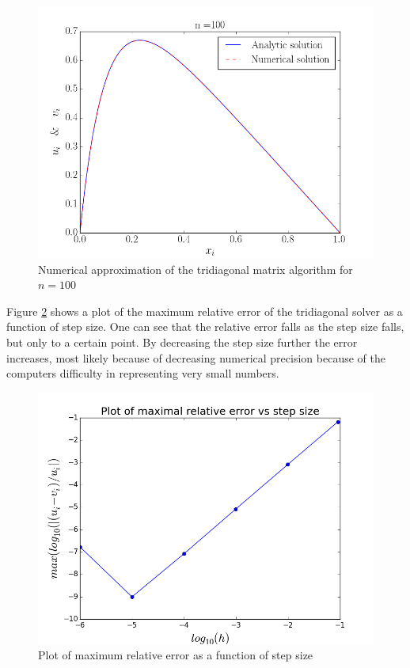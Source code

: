 \documentclass[10pt, a4paper]{amsart}
\begin{document}
\begin{figure}[h]
  \centering
  \includegraphics[width=0.9\linewidth]{figures/100.png}
  \caption{Numerical approximation of the tridiagonal matrix algorithm for $n=100$}
  \label{fig:n100}
\end{figure}

Figure \ref{fig:relerror} shows a plot of the maximum relative error of the
tridiagonal solver as a function of step size. One can see that the
relative error falls as the step size falls, but only to a certain
point. By decreasing the step size further the error increases, most
likely because of decreasing numerical precision because of the
computers difficulty in representing very small numbers.

\begin{figure}[h]
  \centering
  \includegraphics[width=0.9\linewidth]{figures/relerror.png}
  \caption{Plot of maximum relative error as a function of step size}
  \label{fig:relerror}
\end{figure}
\end{document}
